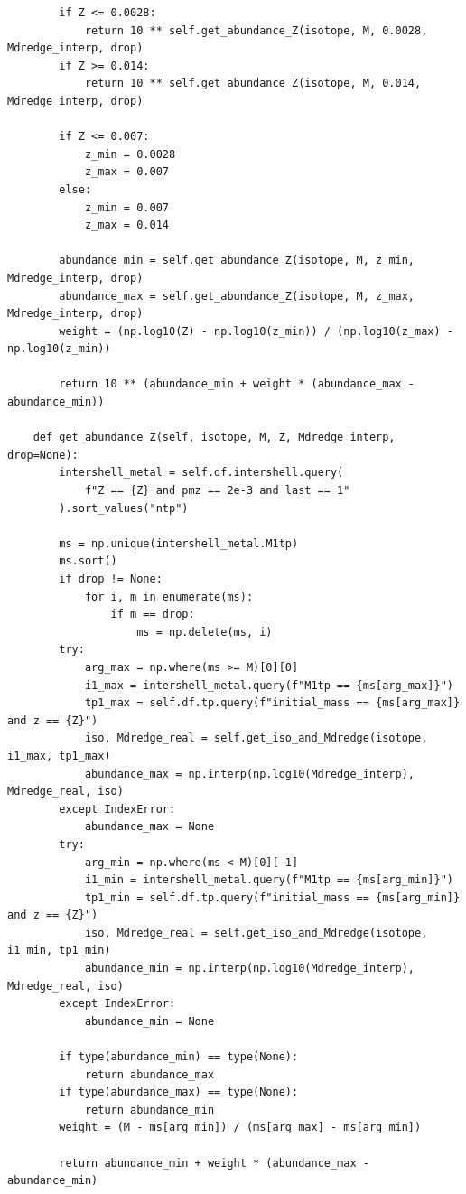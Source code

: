 \documentclass[a4paper,10pt]{article}
\begin{document}
\begin{verbatim}
        if Z <= 0.0028:
            return 10 ** self.get_abundance_Z(isotope, M, 0.0028, Mdredge_interp, drop)
        if Z >= 0.014:
            return 10 ** self.get_abundance_Z(isotope, M, 0.014, Mdredge_interp, drop)

        if Z <= 0.007:
            z_min = 0.0028
            z_max = 0.007
        else:
            z_min = 0.007
            z_max = 0.014

        abundance_min = self.get_abundance_Z(isotope, M, z_min, Mdredge_interp, drop)
        abundance_max = self.get_abundance_Z(isotope, M, z_max, Mdredge_interp, drop)
        weight = (np.log10(Z) - np.log10(z_min)) / (np.log10(z_max) - np.log10(z_min))

        return 10 ** (abundance_min + weight * (abundance_max - abundance_min))

    def get_abundance_Z(self, isotope, M, Z, Mdredge_interp, drop=None):
        intershell_metal = self.df.intershell.query(
            f"Z == {Z} and pmz == 2e-3 and last == 1"
        ).sort_values("ntp")

        ms = np.unique(intershell_metal.M1tp)
        ms.sort()
        if drop != None:
            for i, m in enumerate(ms):
                if m == drop:
                    ms = np.delete(ms, i)
        try:
            arg_max = np.where(ms >= M)[0][0]
            i1_max = intershell_metal.query(f"M1tp == {ms[arg_max]}")
            tp1_max = self.df.tp.query(f"initial_mass == {ms[arg_max]} and z == {Z}")
            iso, Mdredge_real = self.get_iso_and_Mdredge(isotope, i1_max, tp1_max)
            abundance_max = np.interp(np.log10(Mdredge_interp), Mdredge_real, iso)
        except IndexError:
            abundance_max = None
        try:
            arg_min = np.where(ms < M)[0][-1]
            i1_min = intershell_metal.query(f"M1tp == {ms[arg_min]}")
            tp1_min = self.df.tp.query(f"initial_mass == {ms[arg_min]} and z == {Z}")
            iso, Mdredge_real = self.get_iso_and_Mdredge(isotope, i1_min, tp1_min)
            abundance_min = np.interp(np.log10(Mdredge_interp), Mdredge_real, iso)
        except IndexError:
            abundance_min = None

        if type(abundance_min) == type(None):
            return abundance_max
        if type(abundance_max) == type(None):
            return abundance_min
        weight = (M - ms[arg_min]) / (ms[arg_max] - ms[arg_min])

        return abundance_min + weight * (abundance_max - abundance_min)


\end{verbatim}
\end{document}
